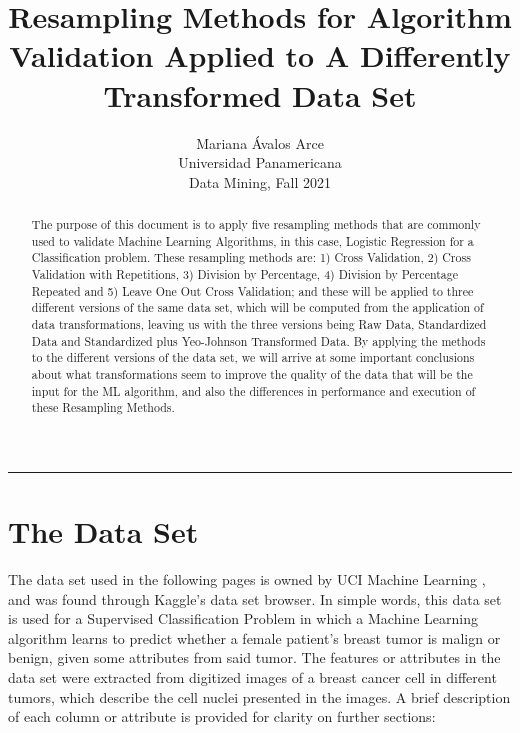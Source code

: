 \documentclass[11pt]{article}
\date{}
\begin{document}
 
 
\title{Resampling Methods for Algorithm Validation Applied to A Differently Transformed Data Set}
\author{Mariana Ávalos Arce \\Universidad Panamericana \\Data Mining, Fall 2021}

\maketitle

\begin{abstract}

The purpose of this document is to apply five resampling methods that are commonly used to validate Machine Learning Algorithms, in this case, Logistic Regression for a Classification problem. These resampling methods are: 1) Cross Validation, 2) Cross Validation with Repetitions, 3) Division by Percentage, 4) Division by Percentage Repeated and 5) Leave One Out Cross Validation; and these will be applied to three different versions of the same data set, which will be computed from the application of data transformations, leaving us with the three versions being Raw Data, Standardized Data and Standardized plus Yeo-Johnson Transformed Data. By applying the methods to the different versions of the data set, we will arrive at some important conclusions about what transformations seem to improve the quality of the data that will be the input for the ML algorithm, and also the differences in performance and execution of these Resampling Methods.
\end{abstract}

\begin{center}
\rule{0.7\textwidth}{.4pt}
\end{center}

\section{The Data Set}

The data set used in the following pages is owned by UCI Machine Learning \cite{bcancer:1}, and was found through Kaggle's data set browser. In simple words, this data set is used for a Supervised Classification Problem in which a Machine Learning algorithm learns to predict whether a female patient's breast tumor is malign or benign, given some attributes from said tumor. The features or attributes in the data set were extracted from digitized images of a breast cancer cell in different tumors, which describe the cell nuclei presented in the images. A brief description of each column or attribute is provided for clarity on further sections:
\\
\end{document}
